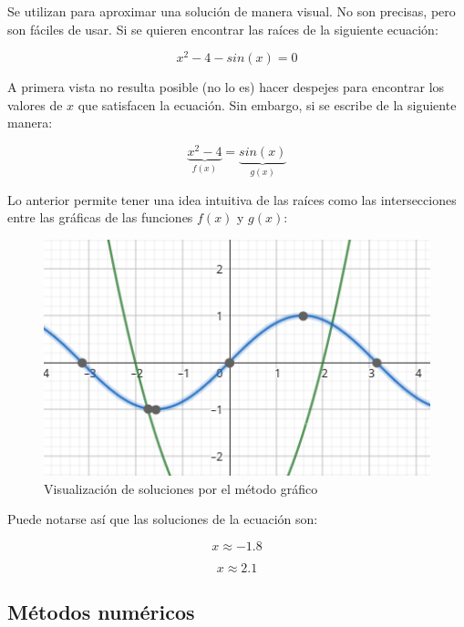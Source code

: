 Se utilizan para aproximar una solución de manera visual. No son precisas, pero
son fáciles de usar. Si se quieren encontrar las raíces de la siguiente
ecuación:

\begin{equation*}{
        x^2 - 4 - sin(x) = 0
}\end{equation*}

A primera vista no resulta posible (no lo es) hacer despejes para
encontrar los valores de \(x\) que satisfacen la ecuación. Sin embargo,
si se escribe de la siguiente manera:

\begin{equation*}{
        \underbrace{x^2 - 4}_{f(x)} = \underbrace{sin(x)}_{g(x)}
}\end{equation*}

Lo anterior permite tener una idea intuitiva de las raíces como las
intersecciones entre las gráficas de las funciones \(f(x)\) y \(g(x)\):

\begin{figure}[H]
    \centering
    \includegraphics[width=1.0\textwidth]{img/papu.png}
    \caption{Visualización de soluciones por el método gráfico}
\end{figure}

Puede notarse así que las soluciones de la ecuación son:

\begin{equation*}{
        x \approx -1.8
}\end{equation*}

\begin{equation*}{
        x \approx 2.1
}\end{equation*}

\subsection{Métodos numéricos}

